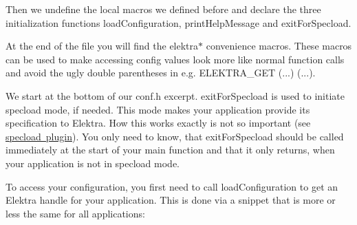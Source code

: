 Then we undefine the local macros we defined before and declare the three initialization functions {\ttfamily load\+Configuration}, {\ttfamily print\+Help\+Message} and {\ttfamily exit\+For\+Specload}.


\begin{DoxyCode}{0}
\DoxyCodeLine{\textcolor{comment}{/* elektra* macros ... */}}
\DoxyCodeLine{}
\DoxyCodeLine{\textcolor{preprocessor}{\#ifdef \_\_cplusplus}}
\DoxyCodeLine{\}}
\DoxyCodeLine{\textcolor{preprocessor}{\#endif}}
\DoxyCodeLine{}
\DoxyCodeLine{\textcolor{preprocessor}{\#endif // CONF\_H}}
\end{DoxyCode}


At the end of the file you will find the {\ttfamily elektra$\ast$} convenience macros. These macros can be used to make accessing config values look more like normal function calls and avoid the ugly double parentheses in e.\+g. {\ttfamily E\+L\+E\+K\+T\+R\+A\+\_\+\+G\+ET (...) (...)}.

We start at the bottom of our {\ttfamily conf.\+h} excerpt. {\ttfamily exit\+For\+Specload} is used to initiate specload mode, if needed. This mode makes your application provide its specification to Elektra. How this works exactly is not so important (see \mbox{\hyperlink{autotoc_md657_src_plugins_specload_README_md}{specload plugin}}). You only need to know, that {\ttfamily exit\+For\+Specload} should be called immediately at the start of your {\ttfamily main} function and that it only returns, when your application is not in specload mode.


\begin{DoxyCode}{0}
\DoxyCodeLine{    \textcolor{comment}{// ...}}
\DoxyCodeLine{\}}
\end{DoxyCode}


To access your configuration, you first need to call {\ttfamily load\+Configuration} to get an {\ttfamily Elektra} handle for your application. This is done via a snippet that is more or less the same for all applications\+:


